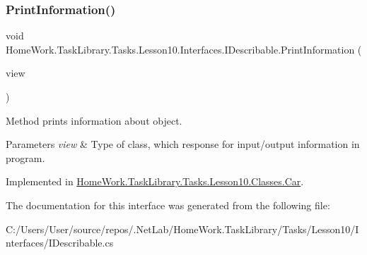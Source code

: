 \subsubsection{\texorpdfstring{PrintInformation()}{PrintInformation()}}
{\footnotesize\ttfamily void Home\+Work.\+Task\+Library.\+Tasks.\+Lesson10.\+Interfaces.\+I\+Describable.\+Print\+Information (\begin{DoxyParamCaption}\item[{I\+Information}]{view }\end{DoxyParamCaption})}



Method prints information about object. 


\begin{DoxyParams}{Parameters}
{\em view} & Type of class, which response for input/output information in program.\\
\hline
\end{DoxyParams}


Implemented in \mbox{\hyperlink{class_home_work_1_1_task_library_1_1_tasks_1_1_lesson10_1_1_classes_1_1_car_a424f8501c10c78f9bfd27bd4c45dca96}{Home\+Work.\+Task\+Library.\+Tasks.\+Lesson10.\+Classes.\+Car}}.



The documentation for this interface was generated from the following file\+:\begin{DoxyCompactItemize}
\item 
C\+:/\+Users/\+User/source/repos/.\+Net\+Lab/\+Home\+Work.\+Task\+Library/\+Tasks/\+Lesson10/\+Interfaces/I\+Describable.\+cs\end{DoxyCompactItemize}
